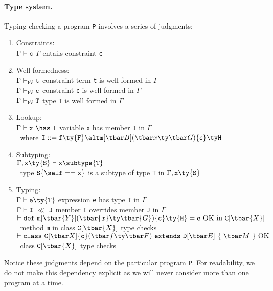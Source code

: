 \paragraph{Type system.} Typing checking a program {\tt P} involves a series of judgments:
\begin{enumerate}
	\item Constraints:\\
	  $\Gamma\vdash {\tt c}$ \hfill $\Gamma$ entails constraint {\tt c}
	\item Well-formedness:\\
	  ${\Gamma} \vdash_{\cal W}{\tt t}$ \hfill constraint term {\tt t} is well formed in $\Gamma$\\
	  ${\Gamma} \vdash_{\cal W}{\tt c}$ \hfill constraint {\tt c} is well formed in $\Gamma$\\
	  ${\Gamma} \vdash_{\cal W}{\tt T}$ \hfill  type {\tt T} is well formed in $\Gamma$
	\item Lookup:\\
	  $\Gamma\vdash {\tt x}~\has~{\tt I}$ \hfill variable {\tt x} has member {\tt I} in $\Gamma$\\
	  $~$ \hfill where ${\tt I}::= {\tt f}\ty{\tt F} \alt \msign{B}{x}{G}{c}{H}$
	\item Subtyping:\\
	  $\Gamma,{\tt x}\ty{\tt S}\vdash{\tt x}\subtype{\tt T}$ \\ $~$ \hfill type ${\tt S}\{\self=={\tt x}\}$ is a 	subtype of type {\tt T} in $\Gamma,{\tt x}\ty{\tt S}$
	\item Typing:\\
	  $\Gamma\vdash {\tt e}\ty{\tt T}$ \hfill expression {\tt e} has type {\tt T} in $\Gamma$\\
	  $\Gamma\vdash {\tt I}~\ll~{\tt J}$ \hfill member {\tt I} overrides member {\tt J} in $\Gamma$\\
	  $\vdash {\tt def}~{\tt m}[\tbar{Y}](\tbar{x}\ty \tbar{G})\{{\tt c}\}\ty {\tt H}={\tt e}~{\rm OK~in}~{\tt C}[\tbar{X}]$ \\ $~$ \hfill method {\tt m} in class ${\tt C}[\tbar{X}]$ type checks\\
	  $\vdash \cdecl~{\rm OK}$ \\ $~$ \hfill class ${\tt C}[\tbar{X}]$ type checks

\end{enumerate}

Notice these judgments depend on the particular program {\tt P}. For readability, we do not make this dependency explicit as we will never consider more than one program at a time.

